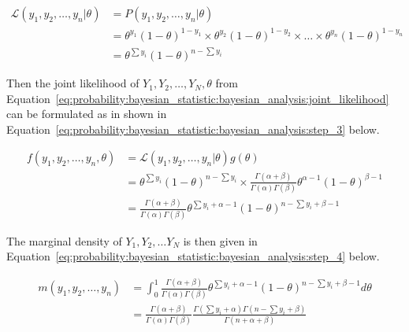 \begin{equation}
      \label{eq:probability:bayesian_statistic:bayesian_analysis:step_2}
      \begin{split}
            \mathcal{L}(y_{1}, y_{2}, \dots, y_{n} \vert \theta)
            &= P(y_{1}, y_{2}, \dots, y_{n} \vert \theta)\\
            &= \theta^{y_{1}}(1-\theta)^{1 - y_{1}} \times \theta^{y_{2}}(1-\theta)^{1 - y_{2}} \times \dots \times \theta^{y_{n}}(1-\theta)^{1 - y_{n}}\\
            &= \theta^{\sum y_{i}}(1-\theta)^{n-\sum y_{i}}
      \end{split}
\end{equation}

\noindent
Then the joint likelihood of $Y_{1}, Y_{2}, \dots, Y_{N}, \theta$ from Equation~\eqref{eq:probability:bayesian_statistic:bayesian_analysis:joint_likelihood} can be formulated as in shown in Equation~\eqref{eq:probability:bayesian_statistic:bayesian_analysis:step_3} below.

\begin{equation}
      \label{eq:probability:bayesian_statistic:bayesian_analysis:step_3}
      \begin{split}
            f(y_{1}, y_{2}, \dots, y_{n}, \theta)
            &= \mathcal{L}(y_{1}, y_{2}, \dots, y_{n} \vert \theta)g(\theta)\\
            &= \theta^{\sum y_{i}}(1-\theta)^{n-\sum y_{i}} \times \frac{\Gamma(\alpha + \beta)}{\Gamma(\alpha)\Gamma(\beta)}\theta^{\alpha - 1}(1 - \theta)^{\beta  - 1}\\
            &= \frac{\Gamma(\alpha + \beta)}{\Gamma(\alpha)\Gamma(\beta)}\theta^{\sum y_{i} + \alpha - 1}(1-\theta)^{n - \sum y_{i} + \beta - 1}
      \end{split}
\end{equation}

\noindent
The marginal density of $Y_{1}, Y_{2}, \dots Y_{N}$ is then given in Equation~\eqref{eq:probability:bayesian_statistic:bayesian_analysis:step_4} below.

\begin{equation}
      \label{eq:probability:bayesian_statistic:bayesian_analysis:step_4}
      \begin{split}
            m(y_{1}, y_{2}, \dots, y_{n})
            &= \int_{0}^{1}\frac{\Gamma(\alpha + \beta)}{\Gamma(\alpha)\Gamma(\beta)}\theta^{\sum y_{i} + \alpha - 1}(1-\theta)^{n - \sum y_{i} + \beta - 1}d\theta\\
            &= \frac{\Gamma(\alpha + \beta)}{\Gamma(\alpha)\Gamma(\beta)}\frac{\Gamma(\sum y_{i} + \alpha)\Gamma(n - \sum y_{i} + \beta)}{\Gamma(n + \alpha + \beta)}
      \end{split}
\end{equation}


